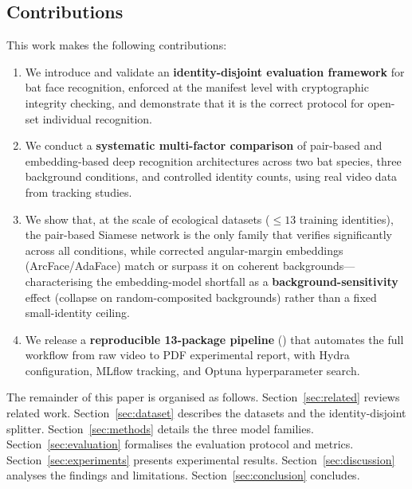 \subsection*{Contributions}

This work makes the following contributions:
\begin{enumerate}[leftmargin=1.6em, itemsep=2pt]
  \item We introduce and validate an \textbf{identity-disjoint evaluation framework} for
        bat face recognition, enforced at the manifest level with cryptographic integrity
        checking, and demonstrate that it is the correct protocol for open-set individual
        recognition.
  \item We conduct a \textbf{systematic multi-factor comparison} of pair-based and
        embedding-based deep recognition architectures across two bat species, three
        background conditions, and controlled identity counts, using real video data from
        tracking studies.
  \item We show that, at the scale of ecological datasets ($\le 13$ training identities),
        the pair-based Siamese network is the only family that verifies significantly
        across all conditions, while corrected angular-margin embeddings (ArcFace/AdaFace)
        match or surpass it on coherent backgrounds---characterising the embedding-model
        shortfall as a \textbf{background-sensitivity} effect (collapse on random-composited
        backgrounds) rather than a fixed small-identity ceiling.
  \item We release a \textbf{reproducible 13-package pipeline} (\batcli) that automates
        the full workflow from raw video to PDF experimental report, with Hydra
        configuration, MLflow tracking, and Optuna hyperparameter search.
\end{enumerate}

The remainder of this paper is organised as follows.
Section~\ref{sec:related} reviews related work.
Section~\ref{sec:dataset} describes the datasets and the identity-disjoint splitter.
Section~\ref{sec:methods} details the three model families.
Section~\ref{sec:evaluation} formalises the evaluation protocol and metrics.
Section~\ref{sec:experiments} presents experimental results.
Section~\ref{sec:discussion} analyses the findings and limitations.
Section~\ref{sec:conclusion} concludes.

